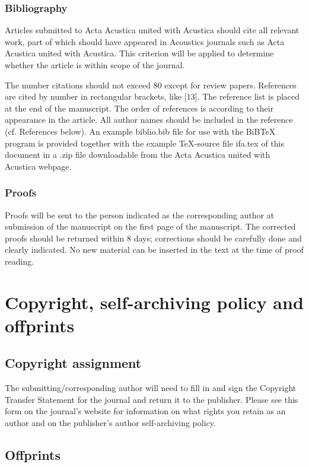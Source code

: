 \documentclass[twoside,twocolumn]{article}
\begin{document}
\subsubsection{Bibliography}

Articles submitted to Acta Acustica united with Acustica should cite all
relevant work, part of which should have appeared in Acoustics journals
such as Acta Acustica united with Acustica. This criterion will be
applied to determine whether the article is within scope of the journal.

The number citations should not exceed 80 except for review papers.
References are cited by number in rectangular brackets, like [13]. The
reference list is placed at the end of the manuscript. The order of
references is according to their appearance in the article. All author
names should be included in the reference (cf. References below). An
example biblio.bib file for use with the BiBTeX program is provided
together with the example \TeX-source file ifa.tex of this document in
a .zip file downloadable from the Acta Acustica united with Acustica
webpage.

\subsubsection{Proofs}

Proofs will be sent to the person indicated as the corresponding author
at submission of the manuscript on the first page of the manuscript. The
corrected proofs should be returned within 8 days; corrections should be
carefully done and clearly indicated. No new material can be inserted in
the text at the time of proof reading.


\section{Copyright, self-archiving policy and offprints}

\subsection{Copyright assignment}

The submitting/corresponding author will need to fill in and sign the
Copyright Transfer Statement for the journal and return it to the
publisher. Please see this form on the journal's website for information
on what rights you retain as an author and on the publisher's author
self-archiving policy.

\subsection{Offprints}
\end{document}
